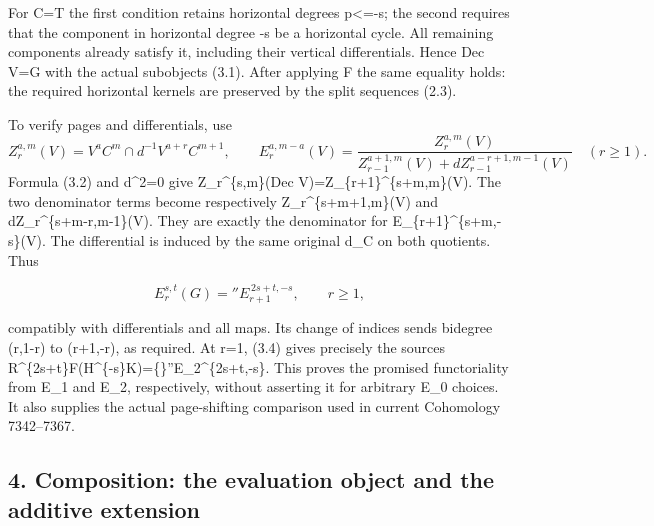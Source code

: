\documentclass[11pt]{article}
\begin{document}
For C\allowbreak{}=T the first condition retains horizontal degrees p<\allowbreak{}=-s; the second requires that the component in horizontal degree -s be a horizontal cycle. All remaining components already satisfy it,\allowbreak{} including their vertical differentials. Hence Dec V\allowbreak{}=G with the actual subobjects (3.1)\allowbreak{}. After applying F the same equality holds:\allowbreak{} the required horizontal kernels are preserved by the split sequences (2.3)\allowbreak{}.

To verify pages and differentials,\allowbreak{} use \[
 Z_r^{a,m}(V)=V^a C^m\cap d^{-1}V^{a+r}C^{m+1},\qquad
 E_r^{a,m-a}(V)=
 \frac{Z_r^{a,m}(V)}
 {Z_{r-1}^{a+1,m}(V)+dZ_{r-1}^{a-r+1,m-1}(V)}
 \quad(r\ge1).                                               \tag{3.3}
\] Formula (3.2)\allowbreak{} and d\textasciicircum{}2\allowbreak{}=0 give Z\_\allowbreak{}r\textasciicircum{}\{s,\allowbreak{}m\}(Dec V)\allowbreak{}\allowbreak{}=Z\_\allowbreak{}\{r\allowbreak{}+1\}\textasciicircum{}\{s\allowbreak{}+m,\allowbreak{}m\}(V)\allowbreak{}. The two denominator terms become respectively Z\_\allowbreak{}r\textasciicircum{}\{s\allowbreak{}+m\allowbreak{}+1,\allowbreak{}m\}(V)\allowbreak{} and dZ\_\allowbreak{}r\textasciicircum{}\{s\allowbreak{}+m-r,\allowbreak{}m-1\}(V)\allowbreak{}. They are exactly the denominator for E\_\allowbreak{}\{r\allowbreak{}+1\}\textasciicircum{}\{s\allowbreak{}+m,\allowbreak{}-s\}(V)\allowbreak{}. The differential is induced by the same original d\_\allowbreak{}C on both quotients. Thus

\[
 E_r^{s,t}(G)= {}''E_{r+1}^{\,2s+t,-s},\qquad r\ge1,            \tag{3.4}
\]

compatibly with differentials and all maps. Its change of indices sends bidegree (r,\allowbreak{}1-r)\allowbreak{} to (r\allowbreak{}+1,\allowbreak{}-r)\allowbreak{},\allowbreak{} as required. At r\allowbreak{}=1,\allowbreak{} (3.4)\allowbreak{} gives precisely the source\textquotesingle s R\textasciicircum{}\{2s\allowbreak{}+t\}F(H\textasciicircum{}\{-s\}K)\allowbreak{}\allowbreak{}=\{\}''E\_\allowbreak{}2\textasciicircum{}\{2s\allowbreak{}+t,\allowbreak{}-s\}. This proves the promised functoriality from E\_\allowbreak{}1 and E\_\allowbreak{}2,\allowbreak{} respectively,\allowbreak{} without asserting it for arbitrary E\_\allowbreak{}0 choices. It also supplies the actual page-shifting comparison used in current Cohomology 7342–\allowbreak{}7367.

\subsection{\texorpdfstring{4. Composition:\allowbreak{} the evaluation object and the additive extension}{4.  the evaluation object and the additive extension}}\label{proofs-7096-7578-composition-the-evaluation-object-and-the-additive-extension}
\end{document}
